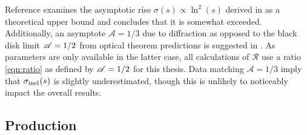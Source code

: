 

Reference \cite{Fagundes_2013} examines the asymptotic rise $\sigma(s) \propto \ln^2(s)$ derived in \cite{Froissart_1961}
as a theoretical upper bound and concludes that it is somewhat exceeded. Additionally, an asymptote $\mathscr{A} = 1/3$ due to
diffraction as opposed to the black disk limit $\mathscr{A} = 1/2 \kern+0.2pt$ from optical theorem predictions is suggested
in \cite{Fagundes_2013}. As parameters are only available in the latter case, all calculations of $\mathscr{R}$
use a ratio \eqref{eqn:ratio} as defined by $\mathscr{A} = 1/2 \kern+0.2pt$ for this thesis. Data matching $\mathscr{A} = 1/3$
imply that $\sigma_{\text{inel}\kern+0.5pt}(s)$ is slightly underestimated, though this is unlikely to
noticeably impact the overall results.





\subsection{Production}
\label{sub:production}

